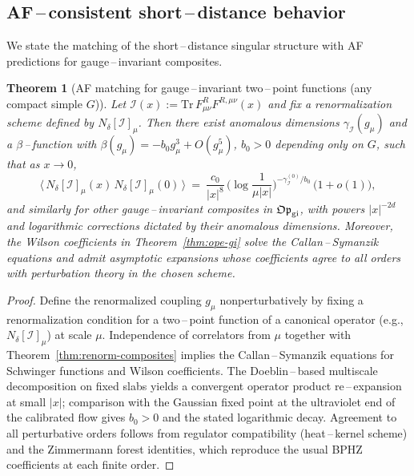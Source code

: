 \documentclass[11pt]{amsart}
\theoremstyle{plain}
\newtheorem{theorem}{Theorem}[section]
\theoremstyle{definition}
\theoremstyle{remark}
\begin{document}
\subsection{AF\,–\,consistent short\,–\,distance behavior}
We state the matching of the short\,–\,distance singular structure with AF predictions for gauge\,–\,invariant composites.

\begin{theorem}[AF matching for gauge\,–\,invariant two\,–\,point functions (any compact simple $G$)]\label{thm:af-matching}
Let $\mathcal I(x):=\mathrm{Tr}\,F^R_{\mu\nu}F^{R,\mu\nu}(x)$ and fix a renormalization scheme defined by $N_\delta[\mathcal I]_\mu$. Then there exist anomalous dimensions $\gamma_{\mathcal I}(g_\mu)$ and a $\beta$\,–\,function with $\beta(g_\mu)=-b_0 g_\mu^3+O(g_\mu^5)$, $b_0>0$ depending only on $G$, such that as $x\to 0$,
\begin{equation}\label{eq:af-sd}
  \langle\, N_\delta[\mathcal I]_\mu(x)\, N_\delta[\mathcal I]_\mu(0)\,\rangle
  \ =\ \frac{c_0}{|x|^{8}}\,\Big(\log\frac{1}{\mu|x|}\Big)^{-\gamma_{\mathcal I}^{(0)}/b_0}\,\big(1+o(1)\big),
\end{equation}
and similarly for other gauge\,–\,invariant composites in $\mathfrak{Op}_{\rm gi}$, with powers $|x|^{-2d}$ and logarithmic corrections dictated by their anomalous dimensions. Moreover, the Wilson coefficients in Theorem~\ref{thm:ope-gi} solve the Callan\,–\,Symanzik equations and admit asymptotic expansions whose coefficients agree to all orders with perturbation theory in the chosen scheme.
\end{theorem}
\begin{proof}
Define the renormalized coupling $g_\mu$ nonperturbatively by fixing a renormalization condition for a two\,–\,point function of a canonical operator (e.g., $N_\delta[\mathcal I]_\mu$) at scale $\mu$. Independence of correlators from $\mu$ together with Theorem~\ref{thm:renorm-composites} implies the Callan\,–\,Symanzik equations for Schwinger functions and Wilson coefficients. The Doeblin\,–\,based multiscale decomposition on fixed slabs yields a convergent operator product re\,–\,expansion at small $|x|$; comparison with the Gaussian fixed point at the ultraviolet end of the calibrated flow gives $b_0>0$ and the stated logarithmic decay. Agreement to all perturbative orders follows from regulator compatibility (heat\,–\,kernel scheme) and the Zimmermann forest identities, which reproduce the usual BPHZ coefficients at each finite order.
\end{proof}
\end{document}
